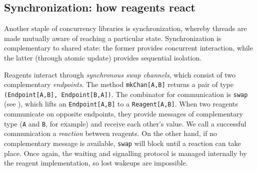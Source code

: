 \documentclass[preprint,nocopyrightspace]{sigplanconf}
\begin{document}



\subsection{Synchronization: how reagents react}
\label{sec:sync}


Another staple of concurrency libraries is synchronization, whereby
threads are made mutually aware of reaching a particular state.
Synchronization is complementary to shared state: the former
provides concurrent interaction, while the latter (through atomic
update) provides sequential isolation.  %

Reagents interact through \emph{synchronous swap channels}, which consist of two
complementary \emph{endpoints}.  The method \lstinline{mkChan[A,B]} returns a pair
of type \lstinline{(Endpoint[A,B], Endpoint[B,A])}.
The combinator for communication is \lstinline{swap} (see
), which lifts an \lstinline{Endpoint[A,B]} to a
\lstinline{Reagent[A,B]}.  When two reagents communicate on opposite
endpoints, they provide messages of complementary type (\lstinline{A}
and \lstinline{B}, for example) and receive each other's value.  We
call a successful communication a \emph{reaction} between reagents.
On the other hand, if no complementary message is available,
\lstinline{swap} will block until a reaction can take place.  Once
again, the waiting and signalling protocol is managed internally by
the reagent implementation, so lost wakeups are impossible.
\end{document}
